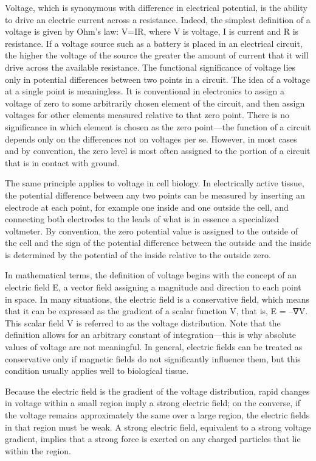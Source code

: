 Voltage, which is synonymous with difference in electrical potential, is the ability to drive an electric current across a resistance. Indeed, the simplest definition of a voltage is given by Ohm's law: V=IR, where V is voltage, I is current and R is resistance. If a voltage source such as a battery is placed in an electrical circuit, the higher the voltage of the source the greater the amount of current that it will drive across the available resistance. The functional significance of voltage lies only in potential differences between two points in a circuit. The idea of a voltage at a single point is meaningless. It is conventional in electronics to assign a voltage of zero to some arbitrarily chosen element of the circuit, and then assign voltages for other elements measured relative to that zero point. There is no significance in which element is chosen as the zero point---the function of a circuit depends only on the differences not on voltages per se. However, in most cases and by convention, the zero level is most often assigned to the portion of a circuit that is in contact with ground.

The same principle applies to voltage in cell biology. In electrically active tissue, the potential difference between any two points can be measured by inserting an electrode at each point, for example one inside and one outside the cell, and connecting both electrodes to the leads of what is in essence a specialized voltmeter. By convention, the zero potential value is assigned to the outside of the cell and the sign of the potential difference between the outside and the inside is determined by the potential of the inside relative to the outside zero.

In mathematical terms, the definition of voltage begins with the concept of an electric field E, a vector field assigning a magnitude and direction to each point in space. In many situations, the electric field is a conservative field, which means that it can be expressed as the gradient of a scalar function V, that is, E = --∇V. This scalar field V is referred to as the voltage distribution. Note that the definition allows for an arbitrary constant of integration---this is why absolute values of voltage are not meaningful. In general, electric fields can be treated as conservative only if magnetic fields do not significantly influence them, but this condition usually applies well to biological tissue.

Because the electric field is the gradient of the voltage distribution, rapid changes in voltage within a small region imply a strong electric field; on the converse, if the voltage remains approximately the same over a large region, the electric fields in that region must be weak. A strong electric field, equivalent to a strong voltage gradient, implies that a strong force is exerted on any charged particles that lie within the region.

